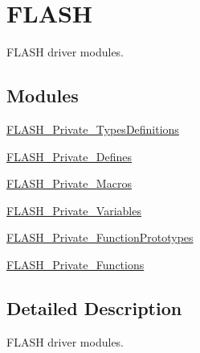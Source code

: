 \hypertarget{group___f_l_a_s_h}{\section{F\-L\-A\-S\-H}
\label{group___f_l_a_s_h}
}


F\-L\-A\-S\-H driver modules.  


\subsection*{Modules}
\begin{DoxyCompactItemize}
\item 
\hyperlink{group___f_l_a_s_h___private___types_definitions}{F\-L\-A\-S\-H\-\_\-\-Private\-\_\-\-Types\-Definitions}
\item 
\hyperlink{group___f_l_a_s_h___private___defines}{F\-L\-A\-S\-H\-\_\-\-Private\-\_\-\-Defines}
\item 
\hyperlink{group___f_l_a_s_h___private___macros}{F\-L\-A\-S\-H\-\_\-\-Private\-\_\-\-Macros}
\item 
\hyperlink{group___f_l_a_s_h___private___variables}{F\-L\-A\-S\-H\-\_\-\-Private\-\_\-\-Variables}
\item 
\hyperlink{group___f_l_a_s_h___private___function_prototypes}{F\-L\-A\-S\-H\-\_\-\-Private\-\_\-\-Function\-Prototypes}
\item 
\hyperlink{group___f_l_a_s_h___private___functions}{F\-L\-A\-S\-H\-\_\-\-Private\-\_\-\-Functions}
\end{DoxyCompactItemize}


\subsection{Detailed Description}
F\-L\-A\-S\-H driver modules. 